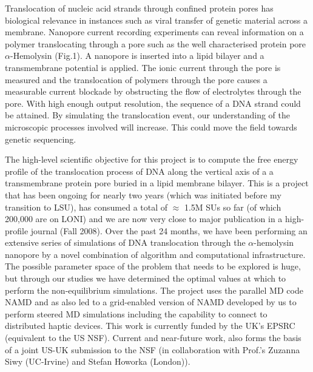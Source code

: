 \documentclass[a4paper,10pt]{article}
\begin{document}
Translocation of nucleic acid strands through confined protein pores has biological relevance in instances 
such as viral transfer of genetic material across a membrane.
Nanopore current recording experiments can reveal information on a polymer translocating through a pore 
such as the well characterised protein pore $\alpha$-Hemolysin (Fig.1). A nanopore is inserted into a lipid 
bilayer and a transmembrane potential is applied. The ionic current through the pore is measured and the 
translocation of polymers through the pore causes a measurable current blockade by obstructing the flow 
of electrolytes through the pore.
With high enough output resolution, the sequence of a DNA strand could be attained. By simulating the 
translocation event, our understanding of the microscopic processes involved will increase. This could 
move the field towards genetic sequencing.

The high-level scientific objective for this project is to compute the free energy
profile of the translocation process of DNA along the vertical axis of a a
transmembrane protein pore buried in a lipid membrane bilayer. This is a project that has been ongoing for nearly two years (which was 
initiated before my transition to LSU),  has consumed a total of $\approx$ 1.5M SUs
so far (of which 200,000 are on LONI) and we are now very close to 
major publication in a high-profile journal (Fall 2008). 
Over the past 24 months, we have been performing an extensive series of
simulations of DNA translocation through the $\alpha$-hemolysin nanopore by a
novel combination of algorithm and computational infrastructure. The possible
parameter space of the problem that needs to be explored is huge, but through
our studies we have
determined the optimal values at which to perform the non-equilibrium simulations.
The project uses the parallel MD code NAMD and as also led to a 
grid-enabled version of NAMD developed by us to perform steered MD simulations
including the capability to connect to distributed haptic devices. This work is currently 
funded by the UK's EPSRC (equivalent to the US NSF).
Current and near-future
work, also forms the basis of a joint US-UK submission to the NSF (in collaboration 
with Prof.'s Zuzanna Siwy (UC-Irvine) and Stefan Howorka (London)). 
\end{document}
